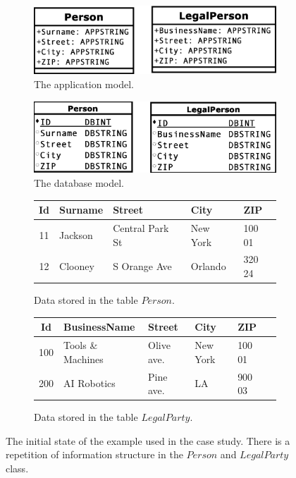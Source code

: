 \documentclass[11pt]{article}
\begin{document}
\begin{figure}
\begin{subfigure}[b]{0.45\textwidth}
	\includegraphics[width=\textwidth]{./images/case_app_1}
	\caption{The application model.}
\end{subfigure}
\quad
\begin{subfigure}[b]{0.45\textwidth}
	\includegraphics[width=\textwidth]{./images/case_db_1}
	\caption{The database model.}
\end{subfigure}
\begin{subfigure}[b]{\textwidth}
	\centering
	\begin{tabular}{| c | l | l | l | l | }
	 	\hline
		Id &  Surname & Street & City & ZIP  \\ \hline  
		11 & Jackson & Central Park St & New York & 100 01  \\ \hline
		12 & Clooney & S Orange Ave & Orlando & 320 24  \\ \hline
	\end{tabular}
	\caption{Data stored in the table $Person$.}
\end{subfigure}
\begin{subfigure}[b]{\textwidth}
	\centering
	\begin{tabular}{| c | l | l | l | l | c |}
	 	\hline
		Id &  BusinessName & Street & City & ZIP \\ \hline  
		100 & Tools \& Machines & Olive ave. & New York & 100 01 \\ \hline
		200 & AI Robotics & Pine ave. & LA & 900 03  \\ \hline
	\end{tabular}
	\caption{Data stored in the table $LegalParty$.}
\end{subfigure}
	\caption{The initial state of the example used in the case study. There is a repetition of information structure in the $Person$ and $LegalParty$ class.}
	\label{fig:case1}
\end{figure}
\end{document}
